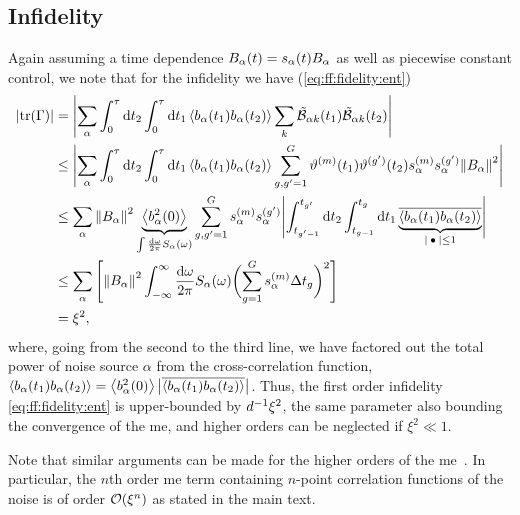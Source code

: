 \subsection{Infidelity}\label{subsec:app:ff:convergence:infidelity}
Again assuming a time dependence $B_\alpha(t) = s_\alpha(t)B_\alpha$ as well as piecewise constant control, we note that for the infidelity we have (\cf \cref{eq:ff:fidelity:ent})
\begin{align}
    \abs{\tr(\decayamps)} &= \abs\Bigg{\sum_{\alpha}\int_0^\tau\dd{t_2}\int_0^\tau\dd{t_1}
                             \expval{b_\alpha(t_1)b_\alpha(t_2)}\sum_{k}\ctrlmat_{\alpha k}(t_1)\ctrlmat_{\alpha k}(t_2)} \notag\\
                          &\leq\abs\Bigg{\sum_{\alpha}\int_0^\tau\dd{t_2}\int_0^\tau\dd{t_1}
                             \expval{b_\alpha(t_1)b_\alpha(t_2)}\sum_{g,g^\prime=1}^{G}\vartheta\gth{m}(t_1)\vartheta^{(g^\prime)}(t_2)
                             s_\alpha\gth{m} s_\alpha^{(g^\prime)} \norm{B_\alpha}^2} \notag\\
                          &\leq\sum_{\alpha}\norm{B_\alpha}^2
                             \underbrace{\expval{b_\alpha^2(0)}}_{\int\frac{\dd{\omega}}{2\pi}S_\alpha(\omega)}
                             \sum_{g,g^\prime=1}^{G} s_\alpha\gth{m} s_\alpha^{(g^\prime)}
                             \abs\Bigg{\int_{t_{g^\prime-1}}^{t_{g^\prime}}\dd{t_2}\int_{t_{g-1}}^{t_g}\dd{t_1}
                             \underbrace{\overline{\expval{b_\alpha(t_1)b_\alpha(t_2)}}}_{\abs{\placeholder}\leq 1}} \notag\\
                          &\leq\sum_{\alpha}\left[\norm{B_\alpha}^2
                             \int_{-\infty}^\infty\frac{\mathrm{d}\omega}{2\pi}S_\alpha(\omega)
                             \biggl(\sum_{g=1}^{G}s_\alpha\gth{m}\Delta t_g\biggr)^2\right] \notag\\
                          &= \xi^2,
\end{align}
where, going from the second to the third line, we have factored out the total power of noise source $\alpha$ from the cross-correlation function, $\expval{b_\alpha(t_1) b_\alpha(t_2)} = \expval{b_\alpha^2(0)}\bigl\lvert\overline{\expval{b_\alpha(t_1)b_\alpha(t_2)}}\bigr\rvert$.
Thus, the first order infidelity \cref{eq:ff:fidelity:ent} is upper-bounded by $d^{-1}\xi^2$, the same parameter also bounding the convergence of the \gls{me}, and higher orders can be neglected if $\xi^2\ll 1$.

Note that similar arguments can be made for the higher orders of the \gls{me}~\cite{Green2013}.
In particular, the $n$th order \gls{me} term containing $n$-point correlation functions of the noise is of order $\order{\xi^n}$ as stated in the main text.

